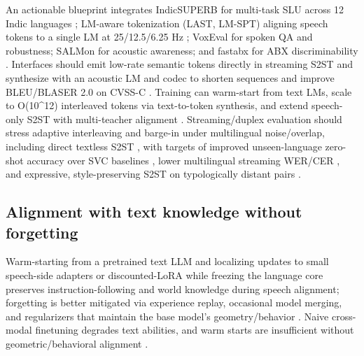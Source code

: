 \documentclass{article}
\begin{document}
An actionable blueprint integrates IndicSUPERB for multi-task SLU across 12 Indic languages \cite{entry2025indicsuperbspeechprocessinguniversalperf}; LM-aware tokenization (LAST, LM-SPT) aligning speech tokens to a single LM at 25/12.5/6.25 Hz \cite{turetzky2024lastlanguagemodelawarespeechtokenization,jo2025lmsptalignedsemanticdistillationspeechto}; VoxEval for spoken QA and robustness; SALMon for acoustic awareness; and fastabx for ABX discriminability \cite{cui2025voxevalbenchmarkingknowledgeunderstandin,maimon2025salmonsuiteacousticlanguagemodelevaluati,poli2025fastabxlibraryefficientcomputationabxdis}. Interfaces should emit low-rate semantic tokens directly in streaming S2ST and synthesize with an acoustic LM and codec to shorten sequences and improve BLEU/BLASER 2.0 on CVSS-C \cite{zhao2024textlessstreamingspeechtranslationsemant,jo2025lmsptalignedsemanticdistillationspeechto}. Training can warm-start from text LMs, scale to O(10^{12}) interleaved tokens via text-to-token synthesis, and extend speech-only S2ST with multi-teacher alignment \cite{hassid2024textuallypretrainedspeechlanguagemodels,turetzky2024lastlanguagemodelawarespeechtokenization,zeng2024scalingspeechtextpretrainingsyntheticint}. Streaming/duplex evaluation should stress adaptive interleaving and barge-in under multilingual noise/overlap, including direct textless S2ST \cite{hu2025salmduplexefficientdirectmodelingspeechl,zhao2024textlessstreamingspeechtranslationsemant,wang2023slmbridgethingapbetweenspeechtextfoundat}, with targets of improved unseen-language zero-shot accuracy over SVC baselines \cite{hsu2024exploringcontextlearningtextlessspeechla}, lower multilingual streaming WER/CER \cite{li2025transsionmultilingualspeechrecognitionsy}, and expressive, style-preserving S2ST on typologically distant pairs \cite{huang2023holisticcascadesystembenchmarkhumanevalu}.

\subsection{Alignment with text knowledge without forgetting} \label{subsec:alignmentwithtextknowledgewithoutforgetting}

Warm-starting from a pretrained text LLM and localizing updates to small speech-side adapters or discounted-LoRA while freezing the language core preserves instruction-following and world knowledge during speech alignment; forgetting is better mitigated via experience replay, occasional model merging, and regularizers that maintain the base model's geometry/behavior \cite{hsiao2025analyzingmitigationstrategiescatastrophi,hassid2024textuallypretrainedspeechlanguagemodels,lu2024destaenhancingspeechlanguagemodelsthroug,wang2023slmbridgethingapbetweenspeechtextfoundat}. Naive cross-modal finetuning degrades text abilities, and warm starts are insufficient without geometric/behavioral alignment \cite{peng2024mslms2stmultitaskspeechlanguagemodeltext}.
\end{document}
